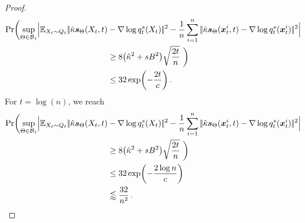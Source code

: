 \begin{proof}
\begin{align*}
      \Pr \biggl(\sup_{\NetP\in \paramspaceone}\Bigl|\E_{X_t\sim Q_t}\norm{\scaleh\scoref(X_t,t)&-\nabla\log q^s_t(X_t)}^2
     -\frac{1}{n} \sum_{i=1}^{n}  \norm{\scaleh\scoref(\x_t^i,t)-\nabla\log q^s_t(\x_t^i)}^2\Bigr| \\
     &\ge 8 \bigl (\scaleh^2+s {\DerBound}^2\bigr)\sqrt{\frac{2t}{n}}\ \biggr)\\
     &\le 32\exp\biggl(-\frac{2t}{c}\biggr)\,.
 \end{align*}
 For $t=\log (n)$, we reach 
  \begin{align*}
      \Pr \biggl(\sup_{\NetP\in \paramspaceone}\Bigl|\E_{X_t\sim Q_t}\norm{\scaleh\scoref(X_t,t)&-\nabla\log q^s_t(X_t)}^2
     -\frac{1}{n} \sum_{i=1}^{n}  \norm{\scaleh\scoref(\x_t^i,t)-\nabla\log q^s_t(\x_t^i)}^2\Bigr| \\
     &\ge 8 \bigl (\scaleh^2+s {\DerBound}^2\bigr)\sqrt{\frac{2t}{n}}\ \biggr)\\
     &\le 32\exp\biggl(-\frac{2\log n}{c}\biggr)\\
     &\lessapprox \frac{32}{n^2}\,.
 \end{align*}
\end{proof}

